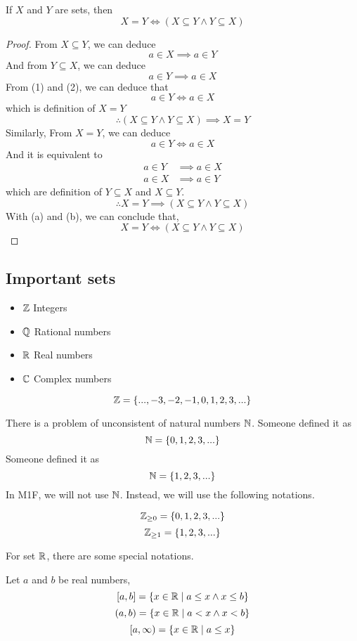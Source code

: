 \documentclass[a4paper]{article}
\begin{document}
\begin{thm}
If $X$ and $Y$ are sets, then
\[
	X = Y \iff (X \subseteq Y \land Y \subseteq X)
\]
\end{thm}
\begin{proof}
From $X \subseteq Y$, we can deduce 
\[
	a \in X \implies a \in Y \tag{1}
\]
And from $Y \subseteq X$, we can deduce
\[
	a \in Y \implies a \in X \tag{2}
\]
From (1) and (2), we can deduce that $$a \in Y \iff a \in X$$which is definition of $X = Y$
\[
	\therefore (X \subseteq Y \land Y \subseteq X) \implies X = Y \tag{a}
\]
Similarly, From $X = Y$, we can deduce
\[
	a \in Y \iff a \in X
\]
And it is equivalent to
\begin{align*}
	a \in Y &\implies a \in X\\
	a \in X &\implies a \in Y
\end{align*}
which are definition of $Y \subseteq X$ and $X \subseteq Y$.
\[
	\therefore X = Y \implies (X \subseteq Y \land Y \subseteq X) \tag{b}
\]
With (a) and (b), we can conclude that,
\[
	X = Y \iff (X \subseteq Y \land Y \subseteq X)
\]
\end{proof}

\subsection{Important sets}
\begin{eg}\leavevmode
	\begin{itemize}
		\item $\Z$ Integers
		\item $\mathbb{Q}$ Rational numbers
		\item $\mathbb{R}$ Real numbers
		\item $\mathbb{C}$ Complex numbers
	\end{itemize}
\end{eg}

\begin{defi}[Integers $\Z$]
$$\mathbb{Z} = \{ ..., -3, -2, -1, 0, 1, 2, 3, ...\}$$
\end{defi}
There is a problem of unconsistent of natural numbers $\mathbb{N}$. Someone defined it as $$\mathbb{N} = \{ 0, 1, 2, 3, ...\}$$Someone defined it as $$\mathbb{N} = \{ 1, 2, 3, ...\}$$
In M1F, we will not use $\mathbb{N}$. Instead, we will use the following notations.
\begin{notation}
$$\mathbb{Z} _{\geq 0} = \{ 0, 1, 2, 3, ...\}$$
$$\mathbb{Z} _{\geq 1} = \{ 1, 2, 3, ...\}$$
\end{notation}

For set $\mathbb{R}$, there are some special notations.
\begin{notation}
Let $a$ and $b$ be real numbers,
$$[a,b] = \{x \in \mathbb{R} \mid a \leq x \land x \leq b\}$$
$$(a,b) = \{x \in \mathbb{R} \mid a < x \land x < b\}$$
$$[a,\infty) = \{x \in \mathbb{R} \mid a \leq x\}$$
\end{notation}
\end{document}
